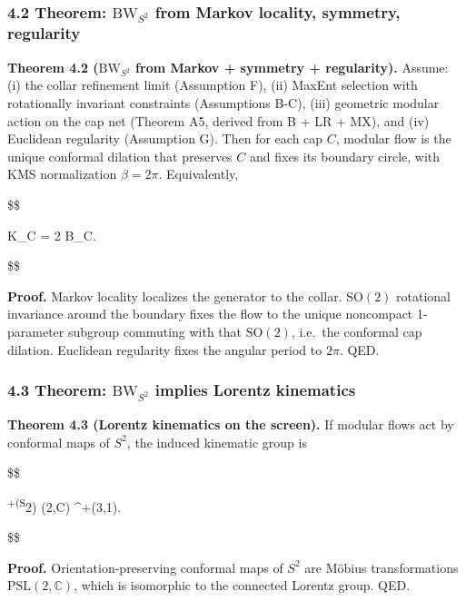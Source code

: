 \documentclass[11pt,a4paper]{article}
\theoremstyle{remark}
\begin{document}
\subsubsection{\texorpdfstring{4.2 Theorem: \(\mathrm{BW}_{S^2}\) from Markov locality, symmetry, regularity}{4.2 Theorem: \textbackslash mathrm\{BW\}\_\{S\^{}2\} from Markov locality, symmetry, regularity}}\label{theorem-mathrmbw_s2-from-markov-locality-symmetry-regularity}

\textbf{Theorem 4.2 (\(\mathrm{BW}_{S^2}\) from Markov + symmetry + regularity).} Assume: (i)
the collar refinement limit (Assumption F), (ii) MaxEnt selection with
rotationally invariant constraints (Assumptions B-C), (iii) geometric modular
action on the cap net (Theorem A5, derived from B + LR + MX), and (iv) Euclidean
regularity (Assumption G). Then for each cap \(C\), modular flow is the unique
conformal dilation that preserves \(C\) and fixes its boundary circle, with KMS
normalization \(\beta = 2\pi\). Equivalently,

\$\$

K\_C = 2 \pi B\_C.

\$\$

\textbf{Proof.} Markov locality localizes the generator to the collar. \(\mathrm{SO}(2)\)
rotational invariance around the boundary fixes the flow to the unique
noncompact 1-parameter subgroup commuting with that \(\mathrm{SO}(2)\), i.e.~the
conformal cap dilation. Euclidean regularity fixes the angular period to
\(2\pi\). QED.

\subsubsection{\texorpdfstring{4.3 Theorem: \(\mathrm{BW}_{S^2}\) implies Lorentz kinematics}{4.3 Theorem: \textbackslash mathrm\{BW\}\_\{S\^{}2\} implies Lorentz kinematics}}\label{theorem-mathrmbw_s2-implies-lorentz-kinematics}

\textbf{Theorem 4.3 (Lorentz kinematics on the screen).} If modular flows act by
conformal maps of \(S^2\), the induced kinematic group is

\$\$

\textsuperscript{+(S}2) \cong {}(2,\mathbb C) \cong {}\^{}+(3,1).

\$\$

\textbf{Proof.} Orientation-preserving conformal maps of \(S^2\) are Möbius
transformations \(\mathrm{PSL}(2,\mathbb{C})\), which is isomorphic to the connected Lorentz
group. QED.
\end{document}

